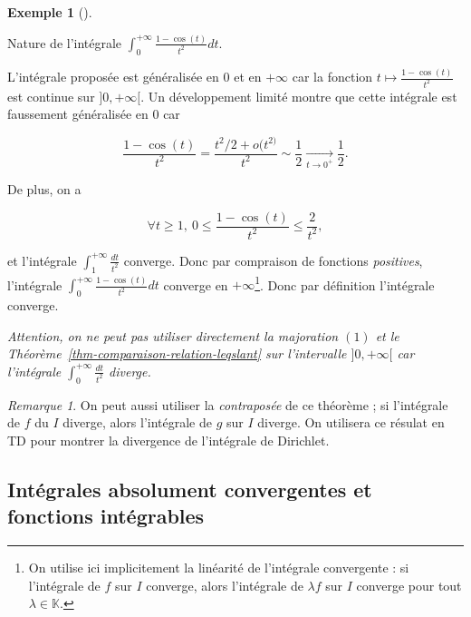\documentclass[
  french,
  letterpaper,
  DIV=11,
  numbers=noendperiod]{scrreprt}
\theoremstyle{plain}
\theoremstyle{definition}
\theoremstyle{plain}
\theoremstyle{plain}
\theoremstyle{definition}
\theoremstyle{definition}
\newtheorem{example}{Exemple}[chapter]
\theoremstyle{plain}
\theoremstyle{remark}
\newtheorem{refremark}{Remarque}[chapter]
\begin{document}
\begin{example}[]\protect\hypertarget{exm-comparaison-fonction-positive}{}\label{exm-comparaison-fonction-positive}

Nature de l'intégrale \(\int_{0}^{+\infty}\frac{1- \cos(t)}{t^{2}}dt\).

L'intégrale proposée est généralisée en \(0\) et en \(+\infty\) car la
fonction \(t
\mapsto \frac{1- \cos(t)}{t^{2}}\) est continue sur \(]0,+\infty[\). Un
développement limité montre que cette intégrale est faussement
généralisée en \(0\) car

\[
    \frac{1- \cos(t)}{t^{2}} = \frac{t^{2}/2 + o(t^{2)}}{t^{2}} \sim \frac{1}{2}
\underset{t \to 0^{+}}{\longrightarrow} \frac{1}{2}.
\]

De plus, on a

\[
    \forall t \geqslant 1,\ 0 \leqslant \frac{1- \cos(t)}{t^{2}} \leqslant
\frac{2}{t^{2}}\tag{1},
\]

et l'intégrale \(\int_{1}^{+\infty}\frac{dt}{t^{2}}\) converge. Donc par
compraison de fonctions \emph{positives}, l'intégrale
\(\int_{0}^{+\infty}\frac{1 - \cos(t)}{t^{2}}dt\) converge en
\(+\infty\)\footnote{On utilise ici implicitement la linéarité de
  l'intégrale convergente : si l'intégrale de \(f\) sur \(I\) converge,
  alors l'intégrale de \(\lambda f\) sur \(I\) converge pour tout
  \(\lambda \in \mathbb{K}\).}. Donc par définition l'intégrale
converge.

\emph{Attention, on ne peut pas utiliser directement la majoration
\((1)\) et le Théorème~\ref{thm-comparaison-relation-leqslant} sur
l'intervalle \(]0,+\infty[\) car l'intégrale
\(\int_{0}^{+\infty}\frac{dt}{t^{2}}\) diverge.}

\end{example}

\begin{refremark}
On peut aussi utiliser la \emph{contraposée} de ce théorème ; si
l'intégrale de \(f\) du \(I\) diverge, alors l'intégrale de \(g\) sur
\(I\) diverge. On utilisera ce résulat en TD pour montrer la divergence
de l'intégrale de Dirichlet.

\label{rem-contraposee}

\end{refremark}

\subsection{Intégrales absolument convergentes et fonctions
intégrables}\label{intuxe9grales-absolument-convergentes-et-fonctions-intuxe9grables}
\end{document}

